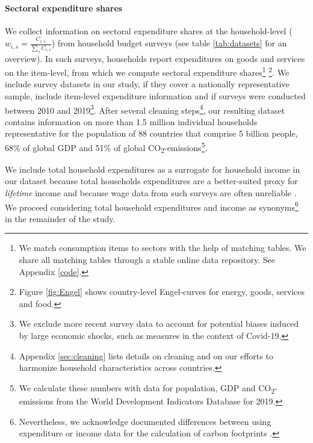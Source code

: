 \documentclass[12pt, a4paper]{article}
\begin{document}
\paragraph{Sectoral expenditure shares} We collect information on sectoral expenditure shares at the household-level ($w_{i,s}=\frac{C_{i,s}}{\sum_{s}C_{i,s}}$) from household budget surveys (see table \ref{tab:datasets} for an overview). In such surveys, households report expenditures on goods and services on the item-level, from which we compute sectoral expenditure shares\footnote{We match consumption items to sectors with the help of matching tables. We share all matching tables through a stable online data repository. See Appendix \ref{code}.} \footnote{Figure \ref{fig:Engel} shows country-level Engel-curves for energy, goods, services and food.}. We include survey datasets in our study, if they cover a nationally representative sample, include item-level expenditure information and if surveys were conducted between 2010 and 2019\footnote{We exclude more recent survey data to account for potential biases induced by large economic shocks, such as measures in the context of Covid-19.}. After several cleaning steps\footnote{Appendix \ref{sec:cleaning} lists details on cleaning and on our efforts to harmonize household characteristics across countries.}, our resulting dataset contains information on more than 1.5 million individual households representative for the population of 88 countries that comprise 5 billion people, 68\% of global GDP and 51\% of global CO\textsubscript{2}-emissions\footnote{We calculate these numbers with data for population, GDP and CO\textsubscript{2}-emissions from the World Development Indicators Database \autocite{WorldBankGroup.2023} for 2019.}.

We include total household expenditures as a surrogate for household income in our dataset because total households expenditures are a better-suited proxy for \textit{lifetime} income \autocite{Poterba.1989,Poterba.1991,Cronin.2019} and because wage data from such surveys are often unreliable \autocite{Blundell.1998}. We proceed considering total household expenditures and income as synonyms\footnote{Nevertheless, we acknowledge documented differences between using expenditure or income data for the calculation of carbon footprints \autocite[see][]{Levay.2023}.} in the remainder of the study.
\end{document}
